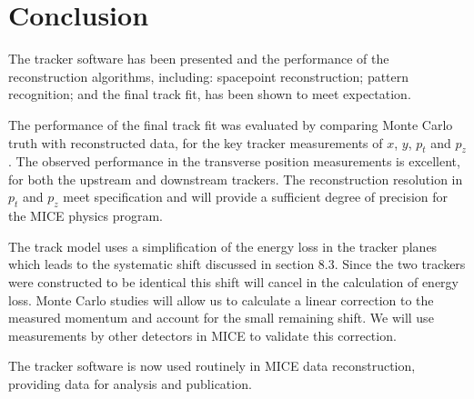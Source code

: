 \section{Conclusion}
\label{sec:Conclusion}
The tracker software has been presented and the performance of the reconstruction algorithms, including: spacepoint reconstruction; pattern recognition; and the final track fit, has been shown to meet expectation.

The performance of the final track fit was evaluated by comparing Monte Carlo truth with reconstructed data, for the key tracker measurements of $x$, $y$, $p_{t}$ and $p_z$.  The observed performance in the transverse position measurements is excellent, for both the upstream and downstream trackers. The reconstruction resolution in $p_t$ and $p_z$ meet specification and will provide a sufficient degree of precision for the MICE physics program. 

The track model uses a simplification of the energy loss in the tracker planes which leads to the systematic shift discussed in section 8.3. Since the two trackers were constructed to be identical this shift will cancel in the calculation of energy loss. Monte Carlo studies will allow us to calculate a linear correction to the measured momentum and account for the small remaining shift. We will use measurements by other detectors in MICE to validate this correction.

The tracker software is now used routinely in MICE data reconstruction, providing data for analysis and publication.

% 


